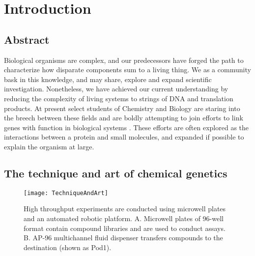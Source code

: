 \chapter{Introduction}

\section{Abstract}

Biological organisms are complex, and our predecessors have forged the path to characterize how disparate components sum to a living thing. We as a community bask in this knowledge, and may share, explore and expand scientific investigation. Nonetheless, we have achieved our current understanding by reducing the complexity of living systems to strings of DNA and translation products. At present select students of Chemistry and Biology are staring into the breech between these fields and are boldly attempting to join efforts to link genes with function in biological systems \cite{saghatelian2005assignment}. These efforts are often explored as the interactions between a protein and small molecules, and expanded if possible to explain the organism at large.

\section{The technique and art of chemical genetics}

\begin{figure}
\centering
\texttt{[image: TechniqueAndArt]}
\caption{High throughput experiments are conducted using microwell plates and an automated robotic platform. A. Microwell plates of 96-well format contain compound libraries and are used to conduct assays. B. AP-96 multichannel fluid dispenser transfers compounds to the destination (shown as Pod1).}
\label{fig:TechniqueAndArt}
\end{figure}

